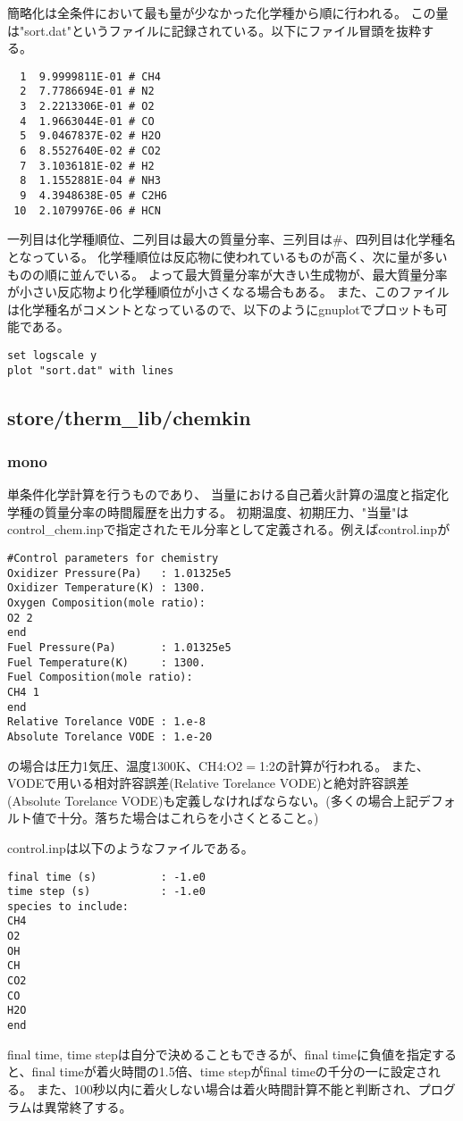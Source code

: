 \documentclass{jsarticle}
\begin{document}
簡略化は全条件において最も量が少なかった化学種から順に行われる。
この量は"sort.dat"というファイルに記録されている。以下にファイル冒頭を抜粋する。
\begin{verbatim}
  1  9.9999811E-01 # CH4               
  2  7.7786694E-01 # N2                
  3  2.2213306E-01 # O2                
  4  1.9663044E-01 # CO                
  5  9.0467837E-02 # H2O               
  6  8.5527640E-02 # CO2               
  7  3.1036181E-02 # H2                
  8  1.1552881E-04 # NH3               
  9  4.3948638E-05 # C2H6              
 10  2.1079976E-06 # HCN               
\end{verbatim}
一列目は化学種順位、二列目は最大の質量分率、三列目は\#、四列目は化学種名となっている。
化学種順位は反応物に使われているものが高く、次に量が多いものの順に並んでいる。
よって最大質量分率が大きい生成物が、最大質量分率が小さい反応物より化学種順位が小さくなる場合もある。
また、このファイルは化学種名がコメントとなっているので、以下のようにgnuplotでプロットも可能である。
\begin{verbatim}
set logscale y
plot "sort.dat" with lines
\end{verbatim}
\subsection{store/therm\_lib/chemkin}%
\subsubsection{mono}%
単条件化学計算を行うものであり、
当量における自己着火計算の温度と指定化学種の質量分率の時間履歴を出力する。
初期温度、初期圧力、"当量"はcontrol\_chem.inpで指定されたモル分率として定義される。例えばcontrol.inpが
\begin{verbatim}
#Control parameters for chemistry
Oxidizer Pressure(Pa)   : 1.01325e5
Oxidizer Temperature(K) : 1300.
Oxygen Composition(mole ratio):
O2 2
end
Fuel Pressure(Pa)       : 1.01325e5
Fuel Temperature(K)     : 1300.
Fuel Composition(mole ratio):
CH4 1
end
Relative Torelance VODE : 1.e-8
Absolute Torelance VODE : 1.e-20
\end{verbatim}
の場合は圧力1気圧、温度1300K、CH4:O2$=$1:2の計算が行われる。
また、VODEで用いる相対許容誤差(Relative Torelance VODE)と絶対許容誤差(Absolute Torelance VODE)も定義しなければならない。(多くの場合上記デフォルト値で十分。落ちた場合はこれらを小さくとること。)

control.inpは以下のようなファイルである。
\begin{verbatim}
final time (s)          : -1.e0
time step (s)           : -1.e0
species to include:
CH4
O2
OH
CH
CO2
CO
H2O
end
\end{verbatim}
final time, time stepは自分で決めることもできるが、final timeに負値を指定すると、final timeが着火時間の1.5倍、time stepがfinal timeの千分の一に設定される。
また、100秒以内に着火しない場合は着火時間計算不能と判断され、プログラムは異常終了する。
\end{document}
